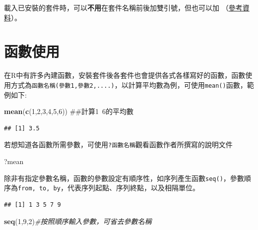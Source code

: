 \documentclass[]{book}
\newenvironment{Shaded}{\begin{snugshade}}{\end{snugshade}}
\newcommand{\KeywordTok}[1]{\textcolor[rgb]{0.13,0.29,0.53}{\textbf{{#1}}}}
\newcommand{\DataTypeTok}[1]{\textcolor[rgb]{0.13,0.29,0.53}{{#1}}}
\newcommand{\DecValTok}[1]{\textcolor[rgb]{0.00,0.00,0.81}{{#1}}}
\newcommand{\CommentTok}[1]{\textcolor[rgb]{0.56,0.35,0.01}{\textit{{#1}}}}
\newcommand{\NormalTok}[1]{{#1}}
\theoremstyle{definition}
\theoremstyle{definition}
\theoremstyle{remark}
\begin{document}
載入已安裝的套件時，可以\textbf{不用}在套件名稱前後加雙引號，但也可以加
（\href{http://stackoverflow.com/questions/25210455/how-can-library-accept-both-quoted-and-unquoted-strings}{參考資料}）。

\section{函數使用}

在R中有許多內建函數，安裝套件後各套件也會提供各式各樣寫好的函數，函數使用方式為\texttt{函數名稱(參數1,參數2,....)}，以計算平均數為例，可使用\texttt{mean()}函數，範例如下:

\begin{Shaded}
\begin{Highlighting}[]
\KeywordTok{mean}\NormalTok{(}\KeywordTok{c}\NormalTok{(}\DecValTok{1}\NormalTok{,}\DecValTok{2}\NormalTok{,}\DecValTok{3}\NormalTok{,}\DecValTok{4}\NormalTok{,}\DecValTok{5}\NormalTok{,}\DecValTok{6}\NormalTok{)) ##計算1~6的平均數}
\end{Highlighting}
\end{Shaded}

\begin{verbatim}
## [1] 3.5
\end{verbatim}

若想知道各函數所需參數，可使用\texttt{?函數名稱}觀看函數作者所撰寫的說明文件

\begin{Shaded}
\begin{Highlighting}[]
\NormalTok{?mean}
\end{Highlighting}
\end{Shaded}

除非有指定參數名稱，函數的參數設定有順序性，如序列產生函數\texttt{seq()}，參數順序為\texttt{from,\ to,\ by}，代表序列起點、序列終點，以及相隔單位。

\begin{Shaded}
\end{Shaded}

\begin{verbatim}
## [1] 1 3 5 7 9
\end{verbatim}

\begin{Shaded}
\begin{Highlighting}[]
\KeywordTok{seq}\NormalTok{(}\DecValTok{1}\NormalTok{,}\DecValTok{9}\NormalTok{,}\DecValTok{2}\NormalTok{)}\CommentTok{#按照順序輸入參數，可省去參數名稱}
\end{Highlighting}
\end{Shaded}
\end{document}
